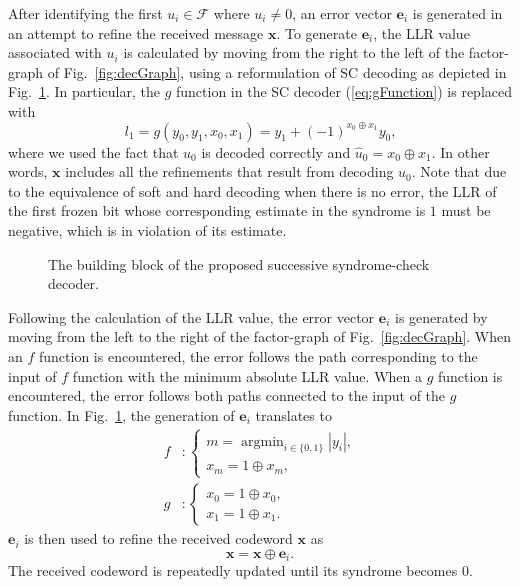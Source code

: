 \documentclass[conference]{IEEEtran}
\DeclareMathOperator*{\argmin}{argmin}
\begin{document}
After identifying the first $u_i \in \mathcal{F}$ where $u_i \neq 0$, an error vector $\bm{e}_i$ is generated in an attempt to refine the received message $\bm{x}$. To generate $\bm{e}_i$, the LLR value associated with $u_i$ is calculated by moving from the right to the left of the factor-graph of Fig.~\ref{fig:decGraph}, using a reformulation of SC decoding as depicted in Fig.~\ref{fig:SSCdecBB}. In particular, the $g$ function in the SC decoder (\ref{eq:gFunction}) is replaced with
\begin{equation}
    l_1 = g(y_0,y_1,x_0,x_1) = y_1 + (-1)^{x_0\oplus x_1}y_0 \text{,} \label{eq:gFunctionS}
\end{equation}
where we used the fact that $u_0$ is decoded correctly and $\hat{u}_0 = x_0 \oplus x_1$. In other words, $\bm{x}$ includes all the refinements that result from decoding $u_0$. Note that due to the equivalence of soft and hard decoding when there is no error, the LLR of the first frozen bit whose corresponding estimate in the syndrome is $1$ must be negative, which is in violation of its estimate.

\begin{figure}
    \centering
    
    \caption{The building block of the proposed successive syndrome-check decoder.}
    \label{fig:SSCdecBB}
\end{figure}

Following the calculation of the LLR value, the error vector $\bm{e}_i$ is generated by moving from the left to the right of the factor-graph of Fig.~\ref{fig:decGraph}. When an $f$ function is encountered, the error follows the path corresponding to the input of $f$ function with the minimum absolute LLR value. When a $g$ function is encountered, the error follows both paths connected to the input of the $g$ function. In Fig.~\ref{fig:SSCdecBB}, the generation of $\bm{e}_i$ translates to
\begin{align}
    f&:
    \begin{cases}
    m = \displaystyle\argmin_{i\in \{0,1\}} |y_i| \text{,} \\
    x_m = 1 \oplus x_m \text{,}
    \end{cases} \label{eq:ferror} \\
    g&:
    \begin{cases}
    x_0 = 1 \oplus x_0 \text{,} \\
    x_1 = 1 \oplus x_1 \text{.}
    \end{cases} \label{eq:gerror}
\end{align}
$\bm{e}_i$ is then used to refine the received codeword $\bm{x}$ as
\begin{equation}
    \bm{x} = \bm{x}\oplus\bm{e}_i \text{.}
\end{equation}
The received codeword is repeatedly updated until its syndrome becomes $0$.
\end{document}
